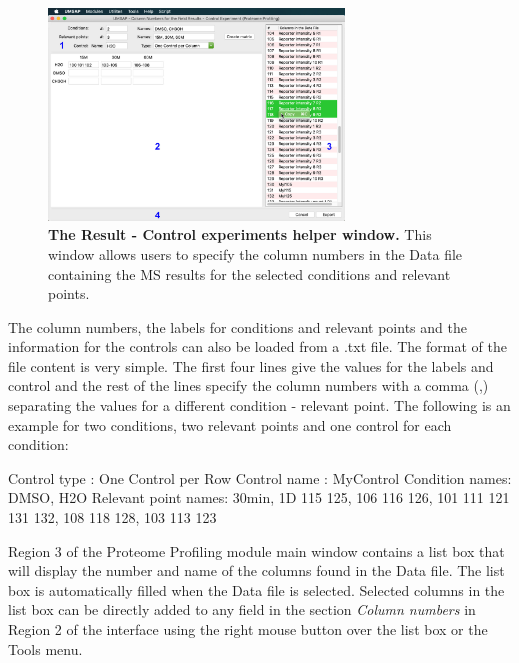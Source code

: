 \begin{figure}[h]
	\centering
	\includegraphics[width=0.7\textwidth]{./IMAGES/MOD-PROTPROF/protprof-rescontrol.jpg}
	\caption[The Result - Control experiments helper window for the Proteome Profiling module]{\textbf{The Result - Control experiments helper window.} This window allows users to specify the column numbers in the Data file containing the MS results for the selected conditions and relevant points.} 
	\label{fig:limprotResControlWindow}
	\vspace{-5pt} 	
\end{figure}

The column numbers, the labels for conditions and relevant points and the information for the controls can also be loaded from a .txt file. The format of the file content is very simple. The first four lines give the values for the labels and control and the rest of the lines specify the column numbers with a comma (,) separating the values for a different condition - relevant point. The following is an example for two conditions, two relevant points and one control for each condition:

Control type : One Control per Row\newline
Control name : MyControl\newline
Condition names: DMSO, H2O\newline
Relevant point names: 30min, 1D\newline
{} 115 125, 106 116 126, 101 111 121   131 132, 108 118 128, 103 113 123\newline

Region \num{3} of the Proteome Profiling module main window contains a list box that will display the number and name of the columns found in the Data file. The list box is automatically filled when the Data file is selected. Selected columns in the list box can be directly added to any field in the section \textit{Column numbers} in Region \num{2} of the interface using the right mouse button over the list box or the Tools menu.


